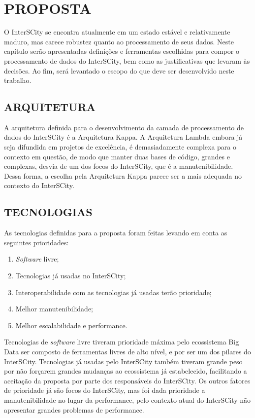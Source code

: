 \chapter[PROPOSTA]{PROPOSTA}
\label{chapter:architecture}

O InterSCity se encontra atualmente em um estado estável e relativamente maduro,
mas carece robustez quanto ao processamento de seus dados. Neste capítulo serão
apresentadas definições e ferramentas escolhidas para compor o processamento
de dados do InterSCity, bem como as justificativas que levaram às decisões. Ao
fim, será levantado o escopo do que deve ser desenvolvido neste trabalho.

\section{ARQUITETURA}

A arquitetura definida para o desenvolvimento da camada de processamento de
dados do InterSCity é a Arquitetura Kappa. A Arquitetura Lambda embora já seja
difundida em projetos de excelência, é demasiadamente complexa para o contexto
em questão, de modo que manter duas bases de código, grandes e complexas,
desvia de um dos focos do InterSCity, que é a manutenibilidade. Dessa forma, a
escolha pela Arquitetura Kappa parece ser a mais adequada no contexto do
InterSCity.

\section{TECNOLOGIAS}

As tecnologias definidas para a proposta foram feitas levando em conta as
seguintes prioridades:

\begin{enumerate}
    \item \textit{Software} livre;
    \item Tecnologias já usadas no InterSCity;
    \item Interoperabilidade com as tecnologias já usadas terão prioridade;
    \item Melhor manutenibilidade;
    \item Melhor escalabilidade e performance.
\end{enumerate}

Tecnologias de \textit{software} livre tiveram prioridade máxima pelo
ecossistema Big Data ser composto de ferramentas livres de alto nível, e por
ser um dos pilares do InterSCity. Tecnologias já usadas pelo InterSCity também
tiveram grande peso por não forçarem grandes mudanças ao ecossistema já
estabelecido, facilitando a aceitação da proposta por parte dos responsáveis do
InterSCity. Os outros fatores de prioridade já são focos do InterSCity,
mas foi dada prioridade a manutenibilidade no lugar da performance, pelo
contexto atual do InterSCity não apresentar grandes problemas de performance.

